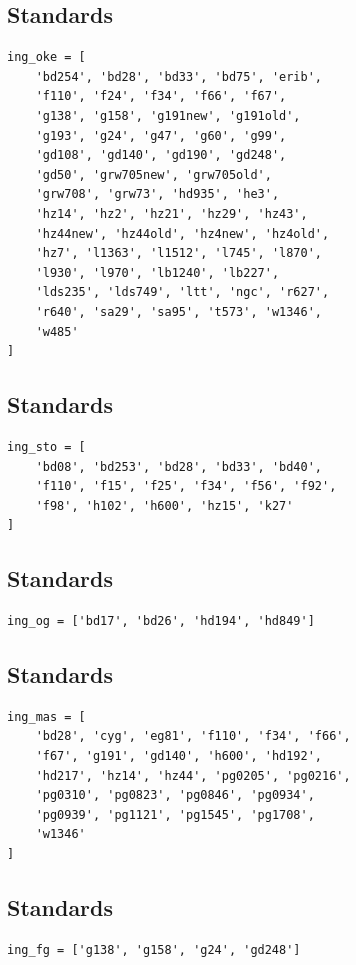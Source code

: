 \documentclass[fleqn,usenatbib]{mnras}
\begin{document}
\subsection*{\citet{1990AJ.....99.1621O} Standards}
\begin{verbatim}
ing_oke = [
    'bd254', 'bd28', 'bd33', 'bd75', 'erib',
    'f110', 'f24', 'f34', 'f66', 'f67',
    'g138', 'g158', 'g191new', 'g191old',
    'g193', 'g24', 'g47', 'g60', 'g99',
    'gd108', 'gd140', 'gd190', 'gd248',
    'gd50', 'grw705new', 'grw705old',
    'grw708', 'grw73', 'hd935', 'he3',
    'hz14', 'hz2', 'hz21', 'hz29', 'hz43',
    'hz44new', 'hz44old', 'hz4new', 'hz4old',
    'hz7', 'l1363', 'l1512', 'l745', 'l870',
    'l930', 'l970', 'lb1240', 'lb227',
    'lds235', 'lds749', 'ltt', 'ngc', 'r627',
    'r640', 'sa29', 'sa95', 't573', 'w1346',
    'w485'
]
\end{verbatim}

\subsection*{\citet{1977ApJ...218..767S} Standards}

\begin{verbatim}
ing_sto = [
    'bd08', 'bd253', 'bd28', 'bd33', 'bd40',
    'f110', 'f15', 'f25', 'f34', 'f56', 'f92',
    'f98', 'h102', 'h600', 'hz15', 'k27'
]
\end{verbatim}


\subsection*{\citet{1965ApJ...141...83E} Standards}
\begin{verbatim}
ing_og = ['bd17', 'bd26', 'hd194', 'hd849']
\end{verbatim}

\subsection*{\citet{1988ApJ...328..315M} Standards}
\begin{verbatim}
ing_mas = [
    'bd28', 'cyg', 'eg81', 'f110', 'f34', 'f66',
    'f67', 'g191', 'gd140', 'h600', 'hd192',
    'hd217', 'hz14', 'hz44', 'pg0205', 'pg0216',
    'pg0310', 'pg0823', 'pg0846', 'pg0934',
    'pg0939', 'pg1121', 'pg1545', 'pg1708',
    'w1346'
]
\end{verbatim}

\subsection*{\citet{1984PASP...96..530F} Standards}
\begin{verbatim}
ing_fg = ['g138', 'g158', 'g24', 'gd248']
\end{verbatim}
\end{document}
